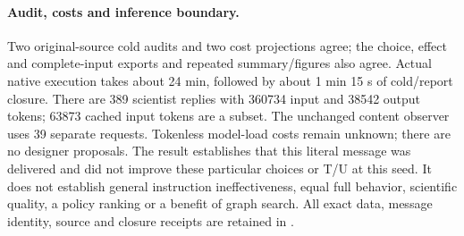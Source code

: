 \paragraph{Audit, costs and inference boundary.}
Two original-source cold audits and two cost projections agree; the choice,
effect and complete-input exports and repeated summary/figures also agree.
Actual native execution takes about 24 min, followed by about 1 min 15 s of cold/report
closure. There are 389 scientist replies with 360734 input and 38542 output
tokens; 63873 cached input tokens are a subset. The unchanged content observer
uses 39 separate requests. Tokenless model-load costs remain unknown; there
are no designer proposals. The result establishes that this literal message
was delivered and did not improve these particular choices or T/U at this
seed. It does not establish general instruction ineffectiveness, equal full
behavior, scientific quality, a policy ranking or a benefit of graph search.
All exact data, message identity, source and closure receipts are retained in
.
\FloatBarrier
